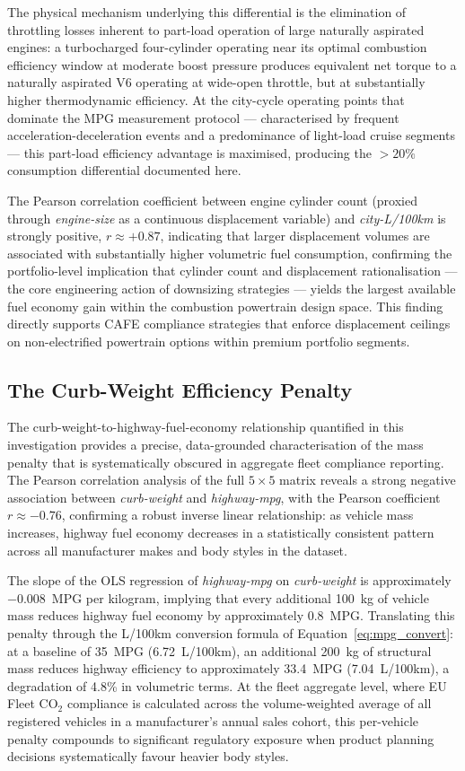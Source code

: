 \documentclass[conference]{IEEEtran}
\begin{document}
The physical mechanism underlying this differential is the elimination
of throttling losses inherent to part-load operation of large naturally
aspirated engines: a turbocharged four-cylinder operating near its
optimal combustion efficiency window at moderate boost pressure produces
equivalent net torque to a naturally aspirated V6 operating at
wide-open throttle, but at substantially higher thermodynamic efficiency.
At the city-cycle operating points that dominate the MPG measurement
protocol — characterised by frequent acceleration-deceleration events
and a predominance of light-load cruise segments — this part-load
efficiency advantage is maximised, producing the $>20\%$ consumption
differential documented here.

The Pearson correlation coefficient between engine cylinder count
(proxied through \textit{engine-size} as a continuous displacement
variable) and \textit{city-L/100km} is strongly positive,
$r \approx +0.87$, indicating that larger displacement volumes are
associated with substantially higher volumetric fuel consumption,
confirming the portfolio-level implication that cylinder count and
displacement rationalisation — the core engineering action of
downsizing strategies — yields the largest available fuel economy
gain within the combustion powertrain design space. This finding
directly supports CAFE compliance strategies that enforce
displacement ceilings on non-electrified powertrain options within
premium portfolio segments.

\subsection{The Curb-Weight Efficiency Penalty}

The curb-weight-to-highway-fuel-economy relationship quantified in
this investigation provides a precise, data-grounded characterisation
of the mass penalty that is systematically obscured in aggregate
fleet compliance reporting. The Pearson correlation analysis of the
full $5 \times 5$ matrix reveals a strong negative association between
\textit{curb-weight} and \textit{highway-mpg}, with the Pearson
coefficient $r \approx -0.76$, confirming a robust inverse linear
relationship: as vehicle mass increases, highway fuel economy decreases
in a statistically consistent pattern across all manufacturer makes
and body styles in the dataset.

The slope of the OLS regression of \textit{highway-mpg} on
\textit{curb-weight} is approximately $-0.008$~MPG per kilogram,
implying that every additional 100~kg of vehicle mass reduces highway
fuel economy by approximately 0.8~MPG. Translating this penalty through
the L/100km conversion formula of Equation~\eqref{eq:mpg_convert}:
at a baseline of 35~MPG (6.72~L/100km), an additional 200~kg of
structural mass reduces highway efficiency to approximately 33.4~MPG
(7.04~L/100km), a degradation of 4.8\% in volumetric terms. At the
fleet aggregate level, where EU Fleet CO$_2$ compliance is calculated
across the volume-weighted average of all registered vehicles in a
manufacturer's annual sales cohort, this per-vehicle penalty
compounds to significant regulatory exposure when product planning
decisions systematically favour heavier body styles.
\end{document}
